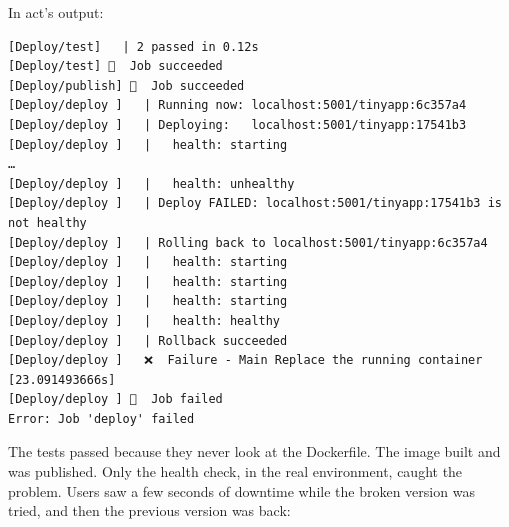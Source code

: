 \begin{codeblock}

\begin{Shaded}
\begin{Highlighting}[]
 
\end{Highlighting}
\end{Shaded}

\end{codeblock}


In act's output:

\begin{codeblock}
\begin{Verbatim}[formatcom=\outputstyle]
[Deploy/test]   | 2 passed in 0.12s
[Deploy/test] 🏁  Job succeeded
[Deploy/publish] 🏁  Job succeeded
[Deploy/deploy ]   | Running now: localhost:5001/tinyapp:6c357a4
[Deploy/deploy ]   | Deploying:   localhost:5001/tinyapp:17541b3
[Deploy/deploy ]   |   health: starting
…
[Deploy/deploy ]   |   health: unhealthy
[Deploy/deploy ]   | Deploy FAILED: localhost:5001/tinyapp:17541b3 is not healthy
[Deploy/deploy ]   | Rolling back to localhost:5001/tinyapp:6c357a4
[Deploy/deploy ]   |   health: starting
[Deploy/deploy ]   |   health: starting
[Deploy/deploy ]   |   health: starting
[Deploy/deploy ]   |   health: healthy
[Deploy/deploy ]   | Rollback succeeded
[Deploy/deploy ]   ❌  Failure - Main Replace the running container [23.091493666s]
[Deploy/deploy ] 🏁  Job failed
Error: Job 'deploy' failed
\end{Verbatim}
\end{codeblock}

The tests passed because they never look at the Dockerfile. The image built and was published. Only the health check, in the real environment, caught the problem. Users saw a few seconds of downtime while the broken version was tried, and then the previous version was back:

\begin{codeblock}

\begin{Shaded}
\begin{Highlighting}[]
 
\end{Highlighting}
\end{Shaded}

\end{codeblock}

